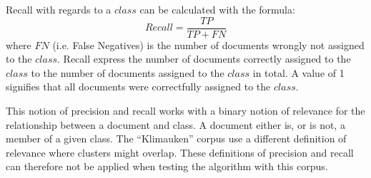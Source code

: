 Recall with regards to a \(class\) can be calculated with the formula: 
\begin{displaymath}
Recall = 
\frac{TP}{TP + FN}
\end{displaymath}
where \(FN\) (i.e. False Negatives) is the number of documents wrongly not assigned to the \(class\). Recall express the number of documents correctly assigned to the \(class\) to the number of documents assigned to the \(class\) in total. A value of 1 signifies that all documents were correctfully assigned to the \(class\).

This notion of precision and recall works with a binary notion of relevance for the relationship between a document and class. A document either is, or is not, a member of a given class. The ``Klimauken'' corpus use a different definition of relevance where clusters might overlap. These definitions of precision and recall can therefore not be applied when testing the \CTC algorithm with this corpus.





